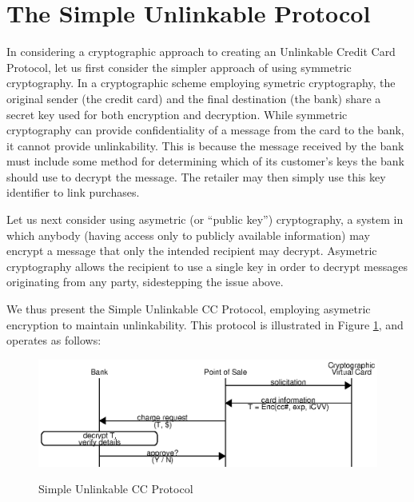 \section{The Simple Unlinkable Protocol}
\label{sec:unlinkable-simple}

In considering a cryptographic approach to creating an Unlinkable Credit Card Protocol, let us first consider the simpler approach of using symmetric cryptography.
In a cryptographic scheme employing symetric cryptography,
    the original sender (the credit card) and the final destination (the bank) share a secret key used for both encryption and decryption.
While symmetric cryptography can provide confidentiality of a message from the card to the bank, it cannot provide unlinkability.
This is because the message received by the bank must include some method for determining which of its customer's keys the bank should use to decrypt the message.
The retailer may then simply use this key identifier to link purchases.

Let us next consider using asymetric (or ``public key'') cryptography,
  a system in which anybody (having access only to publicly available information) may encrypt a message that only the intended recipient may decrypt.
Asymetric cryptography allows the recipient to use a single key in order to decrypt messages originating from any party, sidestepping the issue above.

We thus present the Simple Unlinkable CC Protocol, employing asymetric encryption to maintain unlinkability.
This protocol is illustrated in Figure \ref{fig:simple-cpp}, and operates as follows:

\begin{figure}[h]
  \caption{Simple Unlinkable CC Protocol}
  \centering
    \includegraphics{img/simple-unlinkable-cpp.eps}
  \label{fig:simple-cpp}
\end{figure}

